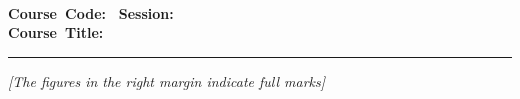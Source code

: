 \begin{center}
	\textbf{\Large{\institutionName{}}}\\[2pt]
	\textbf{\large{\deptName{}}}\\[2pt]
	\textbf{\examName{}}\\[2pt]
	\textbf{Course~Code:~\courseCode{}} \hspace{10mm} \textbf{Session:}~\SessionExaminee\\[2pt]
	\textbf{Course~Title:}~\courseTitle{}\\
	
	
	
\end{center}

\vspace{1mm}
\noindent
{}

\vspace{-2.0mm}
\noindent\rule{\textwidth}{2pt}

\begin{center}
\vspace{-2.0mm}
\textit{[The figures in the right margin indicate full marks]}
\end{center}
\vspace{2mm}
